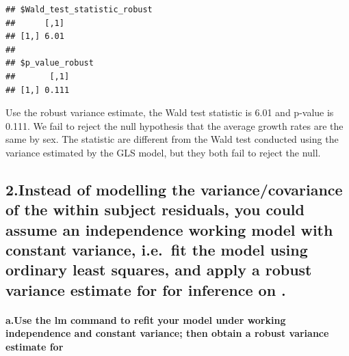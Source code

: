 \documentclass[
]{article}
\begin{document}
\begin{verbatim}
## $Wald_test_statistic_robust
##      [,1]
## [1,] 6.01
## 
## $p_value_robust
##       [,1]
## [1,] 0.111
\end{verbatim}

Use the robust variance estimate, the Wald test statistic is 6.01 and
p-value is 0.111. We fail to reject the null hypothesis that the average
growth rates are the same by sex. The statistic are different from the
Wald test conducted using the variance estimated by the GLS model, but
they both fail to reject the null.

\hypertarget{instead-of-modelling-the-variancecovariance-of-the-within-subject-residuals-you-could-assume-an-independence-working-model-with-constant-variance-i.e.-fit-the-model-using-ordinary-least-squares-and-apply-a-robust-variance-estimate-for-for-inference-on-.}{%
\subsection{2.Instead of modelling the variance/covariance of the within
subject residuals, you could assume an independence working model with
constant variance, i.e.~fit the model using ordinary least squares, and
apply a robust variance estimate for for inference on
.}\label{instead-of-modelling-the-variancecovariance-of-the-within-subject-residuals-you-could-assume-an-independence-working-model-with-constant-variance-i.e.-fit-the-model-using-ordinary-least-squares-and-apply-a-robust-variance-estimate-for-for-inference-on-.}}

\hypertarget{a.use-the-lm-command-to-refit-your-model-under-working-independence-and-constant-variance-then-obtain-a-robust-variance-estimate-for}{%
\paragraph{a.Use the lm command to refit your model under working
independence and constant variance; then obtain a robust variance
estimate
for}\label{a.use-the-lm-command-to-refit-your-model-under-working-independence-and-constant-variance-then-obtain-a-robust-variance-estimate-for}}
\end{document}
